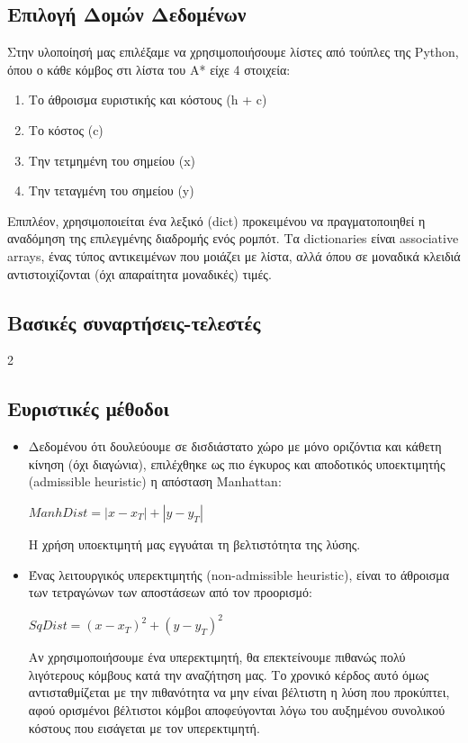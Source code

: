 \documentclass[a4paper,9pt]{article}
\begin{document}



\subsection{Επιλογή Δομών Δεδομένων}
Στην υλοποίησή μας επιλέξαμε να χρησιμοποιήσουμε λίστες από τούπλες της Python,
όπου ο κάθε κόμβος στι λίστα του A* είχε 4 στοιχεία:
\begin{enumerate}
    \item Το άθροισμα ευριστικής και κόστους (h + c)
    \item Το κόστος (c)
    \item Την τετμημένη του σημείου (x)
    \item Την τεταγμένη του σημείου (y)
\end{enumerate}

Επιπλέον, χρησιμοποιείται ένα λεξικό (dict) προκειμένου να
πραγματοποιηθεί η αναδόμηση της επιλεγμένης διαδρομής ενός ρομπότ. Τα
dictionaries είναι associative arrays, ένας τύπος αντικειμένων που μοιάζει με
λίστα, αλλά όπου σε μοναδικά κλειδιά αντιστοιχίζονται (όχι απαραίτητα
μοναδικές) τιμές.



\subsection{Βασικές συναρτήσεις-τελεστές}
2


\subsection{Ευριστικές μέθοδοι}
\begin{itemize}
\item
Δεδομένου ότι δουλεύουμε σε δισδιάστατο χώρο με μόνο οριζόντια και κάθετη
κίνηση (όχι διαγώνια), επιλέχθηκε ως πιο έγκυρος και αποδοτικός υποεκτιμητής
(admissible heuristic) η απόσταση Manhattan:
\begin{center} $ManhDist = |x - x_T| + |y - y_T|$ \end{center}
Η χρήση υποεκτιμητή μας εγγυάται τη βελτιστότητα της λύσης.

\item
Ένας
λειτουργικός υπερεκτιμητής (non-admissible heuristic), είναι το άθροισμα των
τετραγώνων των αποστάσεων από τον προορισμό:
\begin{center} $SqDist = (x - x_T)^2 + (y - y_T)^2$ \end{center}
Αν χρησιμοποιήσουμε ένα υπερεκτιμητή, θα επεκτείνουμε πιθανώς πολύ λιγότερους
κόμβους κατά την αναζήτηση μας. Το χρονικό κέρδος αυτό όμως αντισταθμίζεται με
την πιθανότητα να μην είναι βέλτιστη η λύση που προκύπτει, αφού ορισμένοι
βέλτιστοι κόμβοι αποφεύγονται λόγω του αυξημένου συνολικού κόστους που
εισάγεται με τον υπερεκτιμητή.
\end{itemize}
\end{document}
